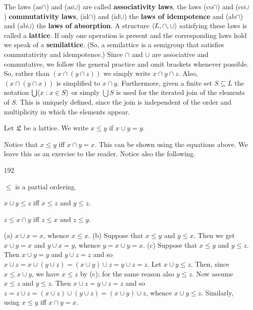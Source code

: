 The laws (as$\cap$) and (as$\cup$) are called \textbf{associativity
laws}, 
the laws (co$\cap$) and (co$\cup$) \textbf{commutativity laws},
(id$\cap$) and (id$\cup$) the \textbf{laws of idempotence} 
and (ab$\cap$) and (ab$\cup$) the \textbf{laws of absorption}.  
A structure $\langle L, \cap, \cup\rangle$ satisfying these laws is called
a \textbf{lattice}. 
If only one operation is present and the
corresponding laws hold we speak of a \textbf{semilattice}. 
(So, a semilattice is a semigroup that satisfies commutativity and
idempotence.) Since $\cap$ and $\cup$ are associative and
commutative, we follow the general practice and omit brackets
whenever possible. So, rather than $(x \cap (y \cap z))$
we simply write $x \cap y \cap z$. Also, $(x \cap (y \cap x))$
is simplified to $x \cap y$. Furthermore, given a
finite set $S \subseteq L$ the notation $\bigcup \langle x : x \in S\rangle$
or simply $\bigcup S$ is used for the iterated join of the
elements of $S$. This is uniquely defined, since the join is
independent of the order and multiplicity in which the elements
appear.
\begin{defn}
Let $\mathfrak{L}$ be a lattice. We write $x \leq y$ if
$x \cup y = y$.
\end{defn}
Notice that $x \leq y$ iff $x \cap y = x$. This
can be shown using the equations above. We leave this as an
exercise to the reader. Notice also the following.
\begin{lem}
\label{lem:order}
\begin{dingautolist}{192}
\item
$\leq$ is a partial ordering.
\item
$x \cup y \leq z$ iff $x \leq z$ and $y \leq z$.
\item
$z \leq x \cap y$ iff $z \leq x$ and $z \leq y$.
\end{dingautolist}
\end{lem}
\proofbeg
{} (a) $x \cup x = x$, whence $x \leq x$. (b) Suppose
that $x \leq y$ and $y \leq x$. Then we get $x \cup y = x$  and
$y \cup x = y$, whence $y = x \cup y = x$. (c) Suppose
that $x \leq y$ and $y \leq z$. Then $x \cup y = y$ and
$y \cup z = z$ and so $x \cup z = x \cup (y \cup z) =
(x \cup y) \cup z = y \cup z = z$.  Let $x \cup y
\leq z$. Then, since $x \leq x \cup y$, we have $x \leq z$ by
(c); for the same reason also $y \leq z$. Now assume
$x \leq z$ and $y \leq z$. Then $x \cup z = y \cup z = z$
and so $z = z \cup z = (x \cup z) \cup (y \cup z) =
(x \cup y) \cup z$, whence $x \cup y \leq z$. 
Similarly, using $x \leq y$ iff $x \cap y = x$.
\proofend

